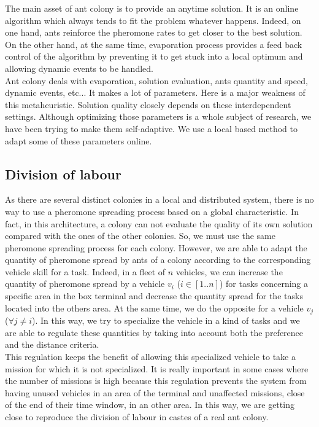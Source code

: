 \documentclass[a4paper,10pt]{article}
\begin{document}
\begin{multicols}{2}
The main asset of ant colony is to provide an anytime solution. It is an online algorithm which always tends to fit the problem whatever happens. %
Indeed, on one hand, ants reinforce the pheromone rates to get closer to the best solution. On the other hand, at the same time, evaporation process provides a feed back control of the algorithm by preventing it to get stuck into a local optimum and allowing dynamic events to be handled.\\

Ant colony deals with evaporation, solution evaluation, ants quantity and speed, dynamic events, etc... It makes a lot of parameters. Here is a major weakness of this metaheuristic. Solution quality closely depends on these interdependent settings. %
Although optimizing those parameters is a whole subject of research, we have been trying to make them self-adaptive. We use a local based method to adapt some of these parameters online.

\subsection{Division of labour}
As there are several distinct colonies in a local and distributed system, there is no way to use a pheromone spreading process based on a global characteristic. In fact, in this architecture, a colony can not evaluate the quality of its own solution compared with the ones of the other colonies. So, we must use the same pheromone spreading process for each colony. However, we are able to adapt the quantity of pheromone spread by ants of a colony according to the corresponding vehicle skill for a task. Indeed, in a fleet of $n$ vehicles, we can increase the quantity of pheromone spread by a vehicle $v_i$ ($i \in [1..n]$) for tasks concerning a specific area in the box terminal and decrease the quantity spread for the tasks located into the others area. At the same time, we do the opposite for a vehicle $v_j$  ($\forall j \neq i$). In this way, we try to specialize the vehicle in a kind of tasks and we are able to regulate these quantities by taking into account both the preference and the distance criteria.\\

This regulation keeps the benefit of allowing this specialized vehicle to take a mission for which it is not specialized. It is really important in some cases where the number of missions is high because this regulation prevents the system from having unused vehicles in an area of the terminal and unaffected missions, close of the end of their time window, in an other area. In this way, we are getting close to reproduce the division of labour in castes of a real ant colony.


\end{multicols}
\end{document}
